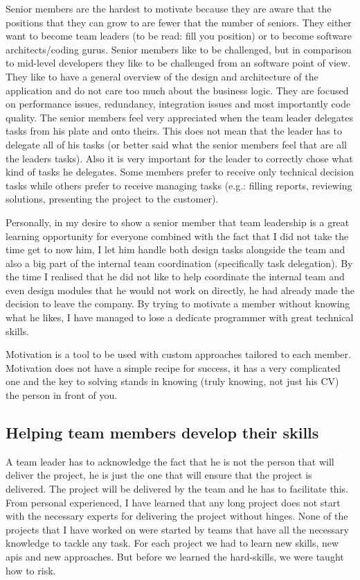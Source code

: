 Senior members are the hardest to motivate because they are aware that the positions that they can grow to are fewer that the number of seniors. They either want to become team leaders (to be read: fill you position) or to become software architects/coding gurus. Senior members like to be challenged, but in comparison to mid-level developers they like to be challenged from an software point of view. They like to have a general overview of the design and architecture of the application and do not care too much about the business logic. They are focused on performance issues, redundancy, integration issues and most importantly code quality. The senior members feel very appreciated when the team leader delegates tasks from his plate and onto theirs. This does not mean that the leader has to delegate all of his tasks (or better said what the senior members feel that are all the leaders tasks). Also it is very important for the leader to correctly chose what kind of tasks he delegates. Some members prefer to receive only technical decision tasks while others prefer to receive managing tasks (e.g.: filling reports, reviewing solutions, presenting the project to the customer).

Personally, in my desire to show a senior member that team leadership is a great learning opportunity for everyone combined with the fact that I did not take the time get to now him, I let him handle both design tasks alongside the team and also a big part of the internal team coordination (specifically task delegation). By the time I realised that he did not like to help coordinate the internal team and even design modules that he would not work on directly, he had already made the decision to leave the company. By trying to motivate a member without knowing what he likes, I have managed to lose a dedicate programmer with great technical skills.

Motivation is a tool to be used with custom approaches tailored to each member. Motivation does not have a simple recipe for success, it has a very complicated one and the key to solving stands in knowing (truly knowing, not just his CV) the person in front of you.

\subsection{Helping team members develop their skills}
A team leader has to acknowledge the fact that he is not the person that will deliver the project, he is just the one that will ensure that the project is delivered. The project will be delivered by the team and he has to facilitate this. From personal experienced, I have learned that any long project does not start with the necessary experts for delivering the project without hinges. None of the projects that I have worked on were started by teams that have all the necessary knowledge to tackle any task. For each project we had to learn new skills, new apis and new approaches. But before we learned the hard-skills, we were taught how to risk.

